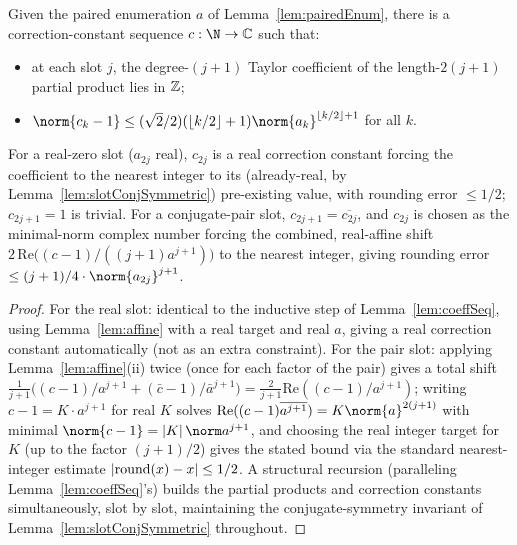 \begin{lemma}
  \label{lem:pairCoeffSeq}
  \leanok
  Given the paired enumeration $a$ of Lemma~\ref{lem:pairedEnum}, there
  is a correction-constant sequence $c : \N \to \C$ such that:
  \begin{itemize}
    \item at each slot $j$, the degree-$(j+1)$ Taylor coefficient of the
      length-$2(j+1)$ partial product lies in $\mathbb{Z}$;
    \item $\norm{c_k - 1} \le (\sqrt2/2)(\lfloor k/2\rfloor+1)
      \norm{a_k}^{\lfloor k/2\rfloor + 1}$ for all $k$.
  \end{itemize}
  For a real-zero slot ($a_{2j}$ real), $c_{2j}$ is a real correction
  constant forcing the coefficient to the nearest integer to its
  (already-real, by Lemma~\ref{lem:slotConjSymmetric}) pre-existing
  value, with rounding error $\le 1/2$; $c_{2j+1} = 1$ is trivial. For a
  conjugate-pair slot, $c_{2j+1} = \overline{c_{2j}}$, and $c_{2j}$ is
  chosen as the minimal-norm complex number forcing the combined,
  real-affine shift $2\,\mathrm{Re}\bigl((c-1)/((j+1)a^{j+1})\bigr)$ to
  the nearest integer, giving rounding error $\le (j+1)/4 \cdot
  \norm{a_{2j}}^{j+1}$.
\end{lemma}
\begin{proof}
  \leanok
  For the real slot: identical to the inductive step of
  Lemma~\ref{lem:coeffSeq}, using Lemma~\ref{lem:affine} with a real
  target and real $a$, giving a real correction constant automatically
  (not as an extra constraint). For the pair slot: applying
  Lemma~\ref{lem:affine}(ii) twice (once for each factor of the pair)
  gives a total shift $\tfrac{1}{j+1}\bigl((c-1)/a^{j+1} +
  (\bar c - 1)/\bar a^{j+1}\bigr) = \tfrac{2}{j+1}\mathrm{Re}((c-1)/a^{j+1})$;
  writing $c - 1 = K \cdot a^{j+1}$ for real $K$ solves
  $\mathrm{Re}((c-1)\overline{a^{j+1}}) = K\norm{a}^{2(j+1)}$ with minimal
  $\norm{c-1} = \abs K \norm a^{j+1}$, and choosing the real integer
  target for $K$ (up to the factor $(j+1)/2$) gives the stated bound via
  the standard nearest-integer estimate $\left|\mathrm{round}(x)-x\right|\le
  1/2$. A structural recursion (paralleling Lemma~\ref{lem:coeffSeq}'s)
  builds the partial products and correction constants simultaneously,
  slot by slot, maintaining the conjugate-symmetry invariant of
  Lemma~\ref{lem:slotConjSymmetric} throughout.
\end{proof}


